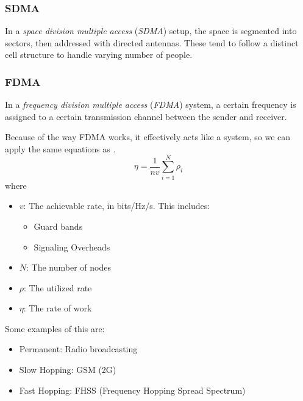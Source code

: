 \subsubsection{SDMA}\label{subsubsec:SDMA}
\begin{definition}\label{def:SDMA}
  In a \emph{space division multiple access} (\emph{SDMA}) setup, the space is segmented into sectors, then addressed with directed antennas.
  These tend to follow a distinct cell structure to handle varying number of people.
\end{definition}

\subsubsection{FDMA}\label{subsubsec:FDMA}
\begin{definition}\label{def:FDMA}
  In a \emph{frequency division multiple access} (\emph{FDMA}) system, a certain frequency is assigned to a certain transmission channel between the sender and receiver.

  Because of the way FDMA works, it effectively acts like a  system, so we can apply the same equations as .
  \begin{equation}\label{eq:FDMA_Work_Rate}
    \eta = \frac{1}{n v} \sum\limits_{i=1}^{N} \rho_{i}
  \end{equation}
  where
  \begin{itemize}[noitemsep]
  \item $v$: The achievable rate, in bits/Hz/s. This includes:
    \begin{itemize}[noitemsep]
    \item Guard bands
    \item Signaling Overheads
    \end{itemize}
  \item $N$: The number of nodes
  \item $\rho$: The utilized rate
  \item $\eta$: The rate of work
  \end{itemize}
\end{definition}

Some examples of this are:
\begin{itemize}[noitemsep]
\item Permanent: Radio broadcasting
\item Slow Hopping: GSM (2G)
\item Fast Hopping: FHSS (Frequency Hopping Spread Spectrum)
\end{itemize}

